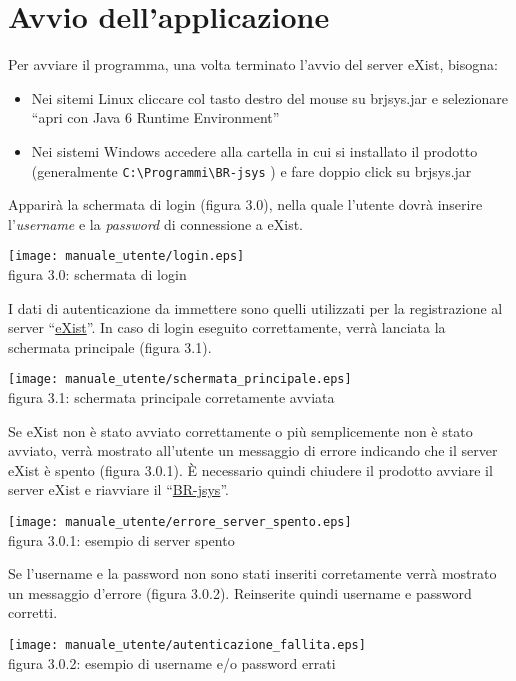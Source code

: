 \section{Avvio dell'applicazione}
Per avviare il programma, una volta terminato l'avvio del server eXist, bisogna:
\begin{itemize}
 \item Nei sitemi Linux cliccare col tasto destro del mouse su brjsys.jar e selezionare ``apri con Java 6 Runtime Environment''
\item Nei sistemi Windows accedere alla cartella in cui si installato il prodotto (generalmente \texttt{C:\textbackslash Programmi\textbackslash BR-jsys} ) e fare doppio click su brjsys.jar 
\end{itemize}
Apparir\`a la schermata di login (figura 3.0), nella quale l'utente dovr\`a inserire l'\textit{username} e la \textit{password} di connessione a eXist.
\begin{center}
\texttt{[image: manuale\_utente/login.eps]}\\
 figura 3.0: schermata di login
\end{center}
I dati di autenticazione da immettere sono quelli utilizzati per la registrazione al server ``\underline{eXist}''.
In caso di login eseguito correttamente, verr\`a lanciata la schermata principale (figura 3.1).
\begin{center}
\texttt{[image: manuale\_utente/schermata\_principale.eps]}\\
 figura 3.1: schermata principale corretamente avviata
\end{center}
Se eXist non \`e stato avviato correttamente o pi\`u semplicemente non \`e stato avviato, verr\`a mostrato all'utente un messaggio di errore indicando che il server eXist \`e spento (figura 3.0.1). \`E necessario quindi chiudere il prodotto avviare il server eXist e riavviare il ``\underline{BR-jsys}''.
\begin{center}
\texttt{[image: manuale\_utente/errore\_server\_spento.eps]}\\
 figura 3.0.1: esempio di server spento
\end{center} 
Se l'username e la password non sono stati inseriti corretamente verr\`a mostrato un messaggio d'errore (figura 3.0.2). Reinserite quindi username e password corretti.
\begin{center}
\texttt{[image: manuale\_utente/autenticazione\_fallita.eps]}\\
figura 3.0.2: esempio di username e/o password errati
\end{center}


